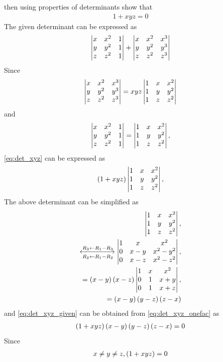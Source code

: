 \documentclass[journal,12pt,twocolumn]{IEEEtran}
\renewcommand\thesection{\arabic{section}}
\begin{document}
\begin{enumerate}[label=\thesection.\arabic*.,ref=\thesection.\theenumi]
		then using properties of determinants show that \begin{align} 1+xyz=0 \nonumber \end{align}
	\solution The given determinant can be expressed as 
\begin{align}
	\begin{vmatrix}x & x^2 & 1 \\ y & y^2 & 1 \\ z & z^2 & 1\end{vmatrix}  
	+\begin{vmatrix}x & x^2 & x^3 \\ y & y^2 & y^3 \\ z & z^2 & z^3\end{vmatrix}  
	\label{eq:det_xyz}
    \end{align}
    Since
\begin{align}
	\begin{vmatrix}x & x^2 & x^3 \\ y & y^2 & y^3 \\ z & z^2 & z^3\end{vmatrix} 
	= xyz  
	\begin{vmatrix}1 & x & x^2 \\ 1 & y & y^2 \\ 1 & z & z^2\end{vmatrix}  
	\label{eq:det_xyz_2}
    \end{align}
    and 
\begin{align}
	\begin{vmatrix}x & x^2 & 1 \\ y & y^2 & 1 \\ z & z^2 & 1\end{vmatrix} 
	= 
	\begin{vmatrix}1 & x & x^2 \\ 1 & y & y^2 \\ 1 & z & z^2\end{vmatrix}, 
	\label{eq:det_xyz_12}
    \end{align}
	\eqref{eq:det_xyz} can be expressed as
\begin{align}
	\left(1+xyz\right)
	\begin{vmatrix}1 & x & x^2 \\ 1 & y & y^2 \\ 1 & z & z^2\end{vmatrix}, 
	\label{eq:det_xyz_onefac}
    \end{align}
    The above determinant can be simplified as
\begin{align}
	\begin{vmatrix}1 & x & x^2 \\ 1 & y & y^2 \\ 1 & z & z^2\end{vmatrix}, 
	\\
\xleftrightarrow[R_2 \leftarrow R_1 -R_2]{R_3 \leftarrow R_1 -R_3}
	\begin{vmatrix}1 & x & x^2 \\ 0 & x-y & x^2-y^2 \\ 0 & x-z & x^2-z^2\end{vmatrix}, 
	\\
	=
	\left(x-y\right)	\left(x-z\right)\begin{vmatrix}1 & x & x^2 \\ 0 & 1 & x+y \\ 0 & 1 & x+z\end{vmatrix}, 
	\\
	=
	\left(x-y\right)\left(y-z\right)	\left(z-x\right)
    \end{align}
	and \eqref{eq:det_xyz_given} can be obtained from 
	\eqref{eq:det_xyz_onefac} as
\begin{align}
	\left(1+xyz\right)
	\left(x-y\right)\left(y-z\right)	\left(z-x\right) = 0
    \end{align}
    Since 
\begin{align}
	x \ne y \ne z, 
	\left(1+xyz\right) = 0
    \end{align}
\end{enumerate}
\end{document}
